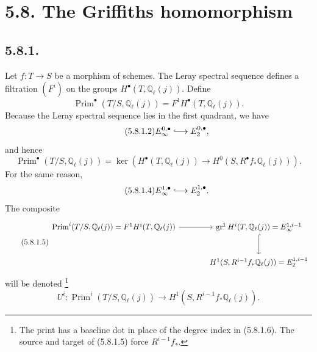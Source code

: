 \section*{5.8. The Griffiths homomorphism}

\subsection*{5.8.1.}
Let $f:T\to S$ be a morphism of schemes.  The Leray spectral sequence
defines a filtration $(F^i)$ on the groups
$H^\bullet(T,\mathbb Q_\ell(j))$.  Define
\begin{equation}\tag{5.8.1.1}
\operatorname{Prim}^\bullet(T/S,\mathbb Q_\ell(j))
=F^1H^\bullet(T,\mathbb Q_\ell(j)).
\end{equation}
Because the Leray spectral sequence lies in the first quadrant, we have
\begin{equation}\tag{5.8.1.2}
E_\infty^{0,\bullet}\lhook\joinrel\longrightarrow E_2^{0,\bullet},
\end{equation}
and hence
\begin{equation}\tag{5.8.1.3}
\operatorname{Prim}^\bullet(T/S,\mathbb Q_\ell(j))
=\ker\!\left(
H^\bullet(T,\mathbb Q_\ell(j))
\longrightarrow H^0(S,R^\bullet f_*\mathbb Q_\ell(j))
\right).
\end{equation}
For the same reason,
\begin{equation}\tag{5.8.1.4}
E_\infty^{1,\bullet}\lhook\joinrel\longrightarrow E_2^{1,\bullet}.
\end{equation}
The composite
\begin{equation}\tag{5.8.1.5}
\begin{tikzcd}[column sep=large,row sep=large]
\operatorname{Prim}^i(T/S,\mathbb Q_\ell(j))
=F^1H^i(T,\mathbb Q_\ell(j))
  \arrow[r]
&
\operatorname{gr}^1H^i(T,\mathbb Q_\ell(j))
=E_\infty^{1,i-1}
  \arrow[d,hook]
\\
{}
&
H^1(S,R^{i-1}f_*\mathbb Q_\ell(j))
=E_2^{1,i-1}
\end{tikzcd}
\end{equation}
will be denoted
\footnote{The print has a baseline dot in place of the degree index in
(5.8.1.6).  The source and target of (5.8.1.5) force $R^{i-1}f_*$.}
\begin{equation}\tag{5.8.1.6}
U^i:\operatorname{Prim}^i(T/S,\mathbb Q_\ell(j))
\longrightarrow H^1(S,R^{i-1}f_*\mathbb Q_\ell(j)).
\end{equation}

